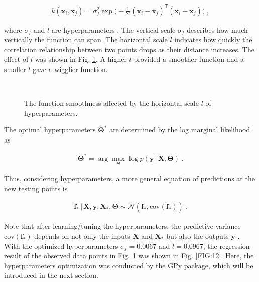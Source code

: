 \documentclass[preprint,12pt]{elsarticle}
\begin{document}
\begin{ceqn}
    \begin{align}
        k(\mathbf{x}_i,\mathbf{x}_j) = \sigma_f^2 \exp \Big(-\frac{1}{2l}
         (\mathbf{x}_i - \mathbf{x}_j)^\mathsf{T}
         (\mathbf{x}_i - \mathbf{x}_j) \Big)  \ , \nonumber
    \end{align}
\end{ceqn}
where $\sigma_f$ and $l$ are hyperparameters \cite{duvenaud2014automatic}. The vertical scale $\sigma_f$ describes how much vertically the function can span. The horizontal scale $l$ indicates how quickly the correlation relationship between two points drops as their distance increases. The effect of $l$ was shown in Fig. \ref{FIG:11}. A higher $l$ provided a smoother function and a smaller $l$ gave a wigglier function. 
\\

\begin{figure}[h!]
    \centering
    \qquad
    \qquad 
    \\
    \vspace{0.1cm}
    \caption{The function smoothness affected by the horizontal scale $l$ of hyperparameters.}
    \label{FIG:11}
\end{figure}

The optimal hyperparameters $\mathbf{\Theta^*}$ are determined by the log marginal likelihood \cite{Rasmussen2006} as  
\begin{ceqn}
    \begin{align}
        \mathbf{\Theta^*} = \arg\max\limits_{\Theta} \log p(\mathbf{y} \, \vert \, \mathbf{X}, \mathbf{\Theta})  \ . \nonumber
    \end{align}
\end{ceqn}
Thus, considering hyperparameters, a more general equation of predictions at the new testing points is \cite{gpss2019}  
\begin{ceqn}
    \begin{align}
        \mathbf{\bar{f}_*} \, \vert \, \mathbf{X}, \mathbf{y}, \mathbf{X}_*,  \mathbf{\Theta} \sim \mathcal{N} \left(\mathbf{\bar{f}_*}, \text{cov}(\mathbf{f}_*)\right)  \ . \nonumber
    \end{align}
\end{ceqn}
Note that after learning/tuning the hyperparameters, the predictive variance $\text{cov}(\mathbf{f}_*)$ depends on not only the inputs $\mathbf{X}$ and $\mathbf{X}_*$ but also the outputs $\mathbf{y}$ \cite{chen2018priors}. With the optimized hyperparameters $\sigma_f = 0.0067$ and $l = 0.0967$, the regression result of the observed data points in Fig. \ref{FIG:11} was shown in Fig. \ref{FIG:12}. Here, the hyperparameters optimization was conducted by the GPy package, which will be introduced in the next section. 
\end{document}
